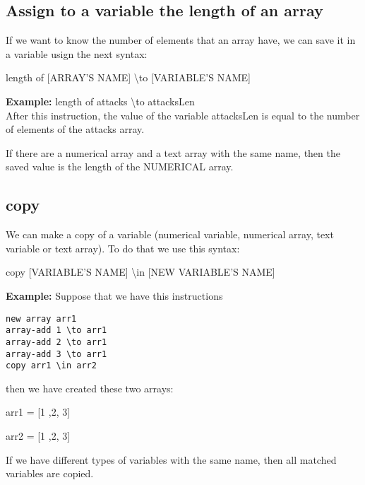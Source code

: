 \documentclass[11pt,a4paper,openright,oneside]{book}
\newenvironment{ex}
{
  \setlength{\parindent}{0cm}
  \large \textbf{Example:} \normalsize 
}
{}
\begin{document}
\subsection{Assign to a variable the length of an array}
If we want to know the number of elements that an array have, we can save it in a variable usign the next syntax:
\begin{center} \textsf{length of \textsc{\scriptsize[ARRAY'S NAME]} \textbackslash to \textsc{\scriptsize[VARIABLE'S NAME]}} \normalsize \end{center}

\begin{ex} \textsf{length of attacks \textbackslash to attacksLen} \\
  After this instruction, the value of the variable \textsf{attacksLen} is equal to the number of elements of the \textsf{attacks} array.
\end{ex}

If there are a numerical array and a text array with the same name, then the saved value is the length of the NUMERICAL array.

\subsection{\textsf{copy}}

We can make a copy of a variable (numerical variable, numerical array, text variable or text array). To do that we use this syntax:
\begin{center} \textsf{copy \textsc{\scriptsize[VARIABLE'S NAME]} \textbackslash in \textsc{\scriptsize[NEW VARIABLE'S NAME]}} \normalsize \end{center}
\begin{ex} Suppose that we have this instructions
  \begin{lstlisting}
new array arr1
array-add 1 \to arr1
array-add 2 \to arr1
array-add 3 \to arr1
copy arr1 \in arr2
  \end{lstlisting}
then we have created these two arrays:
\begin{center} \textsf{arr1 = [1 ,2, 3]} \end{center}
\begin{center} \textsf{arr2 = [1 ,2, 3]} \end{center}
\end{ex}

If we have different types of variables with the same name, then all matched variables are copied.
\end{document}
